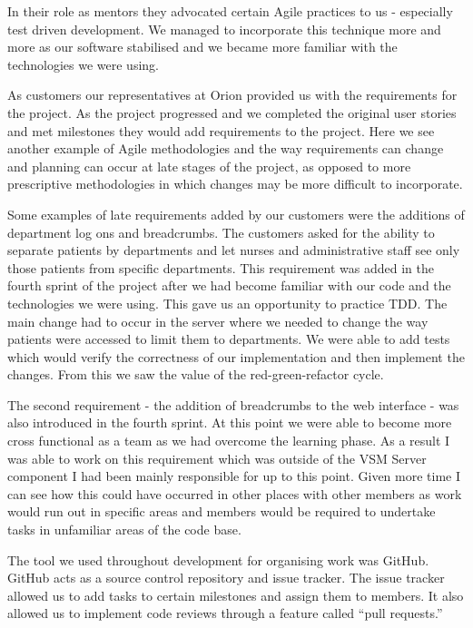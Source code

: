 \documentclass[conference]{IEEEtran}
\begin{document}
In their role as mentors they advocated certain Agile practices to us -
especially test driven development. We managed to incorporate this technique
more and more as our software stabilised and we became more familiar with the
technologies we were using.

As customers our representatives at Orion provided us with the requirements for
the project. As the project progressed and we completed the original user
stories and met milestones they would add requirements to the project. Here we
see another example of Agile methodologies and the way requirements can change
and planning can occur at late stages of the project, as opposed to more
prescriptive methodologies in which changes may be more difficult to
incorporate.

Some examples of late requirements added by our customers were the additions of
department log ons and breadcrumbs. The customers asked for the ability to
separate patients by departments and let nurses and administrative staff see
only those patients from specific departments. This requirement was added in the
fourth sprint of the project after we had become familiar with our code and the
technologies we were using. This gave us an opportunity to practice TDD. The
main change had to occur in the server where we needed to change the way
patients were accessed to limit them to departments. We were able to add tests
which would verify the correctness of our implementation and then implement the
changes. From this we saw the value of the red-green-refactor cycle.

The second requirement - the addition of breadcrumbs to the web interface - was
also introduced in the fourth sprint. At this point we were able to become more
cross functional as a team as we had overcome the learning phase. As a result I
was able to work on this requirement which was outside of the VSM Server
component I had been mainly responsible for up to this point. Given more time I
can see how this could have occurred in other places with other members as work
would run out in specific areas and members would be required to undertake tasks
in unfamiliar areas of the code base.

The tool we used throughout development for organising work was GitHub. GitHub
acts as a source control repository and issue tracker. The issue tracker allowed
us to add tasks to certain milestones and assign them to members. It also
allowed us to implement code reviews through a feature called ``pull requests.''
\end{document}
